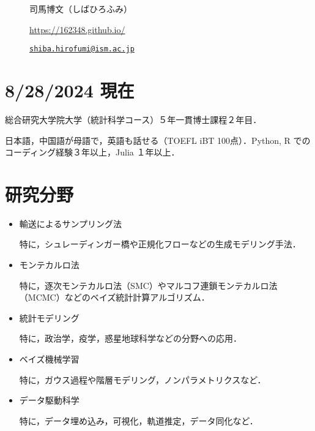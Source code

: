 \documentclass[
  11pt,
]{article}
\author{}
\date{}
\begin{document}
\begin{figure}

\begin{minipage}{0.50\linewidth}

\Huge 司馬博文（しばひろふみ）

\end{minipage}%
%
\begin{minipage}{0.50\linewidth}

\color{minty}

\hfill {} \url{https://162348.github.io/}

\par

\hfill {}
\href{mailto:shiba.hirofumi@ism.ac.jp}{\nolinkurl{shiba.hirofumi@ism.ac.jp}}

\par

\end{minipage}%

\end{figure}%

\vspace{-1em}

\section{8/28/2024 現在}\label{ux73feux5728}

総合研究大学院大学（統計科学コース）５年一貫博士課程２年目．

日本語，中国語が母語で，英語も話せる（TOEFL iBT 100点）．Python, R
でのコーディング経験３年以上，Julia １年以上．

\section{研究分野}\label{ux7814ux7a76ux5206ux91ce}

\begin{itemize}
\item
  輸送によるサンプリング法

  特に，シュレーディンガー橋や正規化フローなどの生成モデリング手法．
\item
  モンテカルロ法

  特に，逐次モンテカルロ法（SMC）やマルコフ連鎖モンテカルロ法（MCMC）などのベイズ統計計算アルゴリズム．
\item
  統計モデリング

  特に，政治学，疫学，惑星地球科学などの分野への応用．
\item
  ベイズ機械学習

  特に，ガウス過程や階層モデリング，ノンパラメトリクスなど．
\item
  データ駆動科学

  特に，データ埋め込み，可視化，軌道推定，データ同化など．
\end{itemize}
\end{document}
